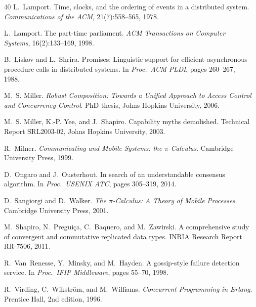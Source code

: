\documentclass[11pt,a4paper]{article}
\begin{document}
\begin{thebibliography}{40}
L.~Lamport.
\newblock Time, clocks, and the ordering of events in a distributed system.
\newblock \emph{Communications of the ACM}, 21(7):558--565, 1978.

L.~Lamport.
\newblock The part-time parliament.
\newblock \emph{ACM Transactions on Computer Systems}, 16(2):133--169, 1998.

B.~Liskov and L.~Shrira.
\newblock Promises: Linguistic support for efficient asynchronous procedure
  calls in distributed systems.
\newblock In \emph{Proc.\ ACM PLDI}, pages 260--267, 1988.

M.~S. Miller.
\newblock \emph{Robust Composition: Towards a Unified Approach to Access
  Control and Concurrency Control}.
\newblock PhD thesis, Johns Hopkins University, 2006.

M.~S. Miller, K.-P. Yee, and J.~Shapiro.
\newblock Capability myths demolished.
\newblock Technical Report SRL2003-02, Johns Hopkins University, 2003.

R.~Milner.
\newblock \emph{Communicating and Mobile Systems: the $\pi$-Calculus}.
\newblock Cambridge University Press, 1999.

D.~Ongaro and J.~Ousterhout.
\newblock In search of an understandable consensus algorithm.
\newblock In \emph{Proc.\ USENIX ATC}, pages 305--319, 2014.

D.~Sangiorgi and D.~Walker.
\newblock \emph{The $\pi$-Calculus: A Theory of Mobile Processes}.
\newblock Cambridge University Press, 2001.

M.~Shapiro, N.~Pregui{\c{c}}a, C.~Baquero, and M.~Zawirski.
\newblock A comprehensive study of convergent and commutative replicated
  data types.
\newblock INRIA Research Report RR-7506, 2011.

R.~Van~Renesse, Y.~Minsky, and M.~Hayden.
\newblock A gossip-style failure detection service.
\newblock In \emph{Proc.\ IFIP Middleware}, pages 55--70, 1998.

R.~Virding, C.~Wikstr{\"o}m, and M.~Williams.
\newblock \emph{Concurrent Programming in Erlang}.
\newblock Prentice Hall, 2nd edition, 1996.


\end{thebibliography}
\end{document}

